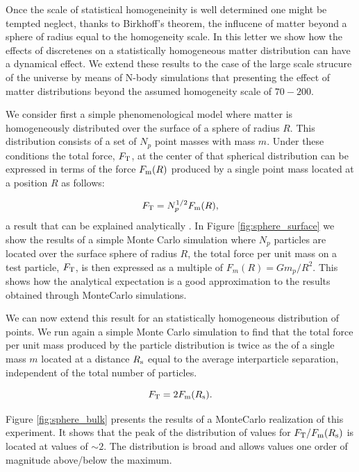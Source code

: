 \documentclass{article}
\newcommand{\hMpc}{{\ifmmode{h^{-1}{\rm Mpc}}\else{$h^{-1}$Mpc }\fi}}
\begin{document}
Once the scale of statistical homogeneinity is well determined one
might be tempted neglect, thanks to Birkhoff's theorem,
the influcene of matter beyond a sphere of radius equal to
the homogeneity scale.  In this letter we show how the effects of
discretenes on a statistically homogeneous matter distribution can
have a dynamical effect. We extend these results to the case of the
large scale strucure of the universe by means of N-body simulations
that presenting the effect of matter distributions beyond the assumed
homogeneity scale of $70-200$\hMpc.
 


 We consider first a simple phenomenological model where matter is
homogeneously distributed over the surface of a sphere of radius
$R$. This distribution consists of a set of $N_p$ point masses with mass
$m$. Under these conditions the total force, $F_{\rm T}$, at the
center of that spherical distribution can be expressed in terms of the
force $F_{\rm m}(R)$ produced by a single point mass located at a
position  $R$ as follows:  

\begin{equation}
F_{\rm T } = N_p^{1/2} F_{\rm m} (R),
\end{equation}
%
a result that can be explained analytically
\cite{Chandra43,Carati2008}. In Figure \ref{fig:sphere_surface} we
show the results of a simple Monte Carlo simulation where $N_p$
particles are located over the surface sphere of radius $R$, the total force per
unit mass on a test particle, $F_{\rm T}$, is then expressed as a
multiple of $F_{m}(R)=Gm_p/R^2$. This shows how the analytical
expectation is a good approximation to the results obtained through
MonteCarlo simulations. 

We can now extend this result for an statistically homogeneous distribution
of points. We run again a simple Monte Carlo simulation to find that
the total force per unit mass produced by the particle distribution is
twice as the of a single mass $m$ located at a distance $R_{\rm s}$ equal to
the average interparticle separation, independent of the total number of
particles. 

\begin{equation}
F_{\rm T} = 2 F_{\rm m}(R_{\rm s}).
\end{equation}

Figure \ref{fig:sphere_bulk} presents the results of a MonteCarlo
realization of this experiment. It shows that the peak of the
distribution of values for $F_{\rm T}/F_{\rm m}(R_{\rm s})$ is
located at values of $\sim 2$. The distribution is broad and allows
values one order of magnitude above/below the maximum. 
\end{document}
